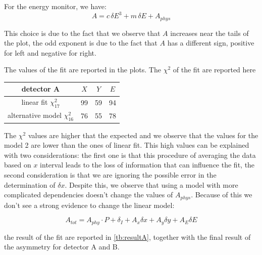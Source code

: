 For the energy monitor, we have:
\begin{equation}
A = c \, \delta E^{3} + m \, \delta E + A_{phys}
\end{equation}

This choice is due to the fact that we observe that $A$ increases near the tails of the plot, the odd exponent is due to the fact that $A$ has a different sign, positive for left and negative for right.

The values of the fit are reported in the plots. The $\chi^{2}$ of the fit are reported here

\begin{table}[h]
\centering
\begin{tabular}{|c|c|c|c|}
\hline 
detector A & $X$ & $Y$ & $E$ \\ 
\hline 
linear fit $\chi^{2}_{17}$ & 99 & 59 & 94 \\ 
\hline 
alternative model $\chi^{2}_{16}$ & 76 & 55 & 78 \\ 
\hline 
\end{tabular} 
\end{table}

The $\chi^{2}$ values are higher that the expected and we observe that the values for the model 2 are lower than the ones of linear fit.
This high values can be explained with two considerations: the first one is that this procedure of averaging the data based on $x$ interval leads to the loss of information that can influence the fit, the second consideration is that we are ignoring the possible error in the determination of $\delta x$.
Despite this, we observe that using a model with more complicated dependencies doesn't change  the values of $A_{phys}$. Because of this we don't see a strong evidence to change the linear model: 

\begin{equation}
A_{tot} = A_{phy} \cdot P + \delta_{I} + A_{x} \delta x + A_{y} \delta y + A_{E} \delta E 
\end{equation}


the result of the fit are reported in \ref{tb:resultA}, together with the final result of the asymmetry for detector A and B.

